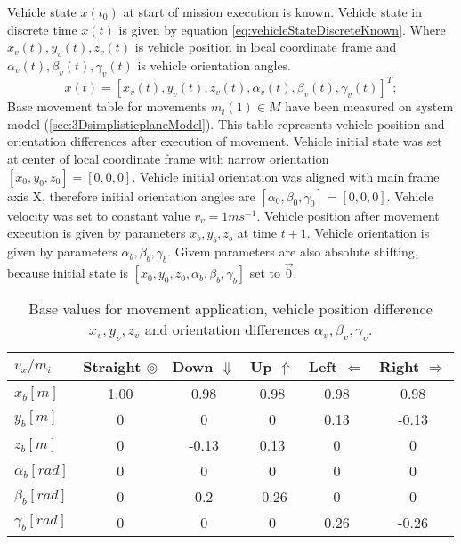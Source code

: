 Vehicle state $x(t_0)$ at start of mission execution is known. Vehicle state in discrete time $x(t)$ is given by equation \ref{eq:vehicleStateDiscreteKnown}. Where $x_v(t),y_v(t),z_v(t)$ is vehicle position in local coordinate frame and $\alpha_v(t),\beta_v(t),\gamma_v(t)$ is vehicle orientation angles.
\begin{equation}\label{eq:vehicleStateDiscreteKnown}
    x(t) = [x_v(t),y_v(t),z_v(t),\alpha_v(t),\beta_v(t),\gamma_v(t)]^T;
\end{equation}
Base movement table for movements $m_i(1)\in M$ have been measured on system model (\ref{sec:3DsimplisticplaneModel}). This table represents vehicle position and orientation differences after execution of movement. Vehicle initial state was set at center of local coordinate frame with narrow orientation $[x_0,y_0,z_0]=[0,0,0]$. Vehicle initial orientation was aligned with main frame axis X, therefore initial orientation angles are $[\alpha_0,\beta_0,\gamma_0] = [0,0,0]$. Vehicle velocity was set to constant value $v_v = 1 ms^{-1}$. Vehicle position after movement execution is given by parameters $x_b,y_b,z_b$ at time $t+1$. Vehicle orientation is given by parameters $\alpha_b,\beta_b,\gamma_b$. Givem parameters are also absolute shifting, because initial state is $[x_0,y_0,z_0,\alpha_b,\beta_b,\gamma_b]$ set to $\vec{0}$.
\begin{table}[H]
    \centering
    \begin{tabular}{|l||c|c|c|c|c|}
    \hline
        $v_x/m_i$           &    Straight $\circledcirc$ & Down $\Downarrow$  & Up $\Uparrow$    & Left $\Leftarrow$ & Right $\Rightarrow$\\\hline\hline
        $x_b [m]$           &    1.00	  & 0.98  & 0.98  & 0.98 & 0.98\\\hline
        $y_b [m]$           &    0	      & 0	  & 0	  & 0.13 & -0.13\\\hline
        $z_b [m]$           &    0	      & -0.13 & 0.13  &	0	 & 0\\\hline
        $\alpha_b [rad]$	&    0	      & 0	  & 0	  & 0    & 0\\\hline
        $\beta_b [rad]$     &    0	      & 0.2   & -0.26 & 0	 & 0\\\hline
        $\gamma_b [rad]$    &    0	      & 0	  & 0	  & 0.26 & -0.26\\\hline
    \end{tabular}
    \caption{Base values for movement application, vehicle position difference $x_v,y_v,z_v$ and orientation differences $\alpha_v,\beta_v,\gamma_v$.}
    \label{tab:movementPredictor}
\end{table}
